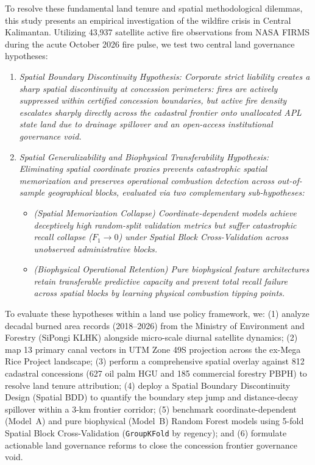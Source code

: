 To resolve these fundamental land tenure and spatial methodological dilemmas, this study presents an empirical investigation of the wildfire crisis in Central Kalimantan. Utilizing 43,937 satellite active fire observations from NASA FIRMS during the acute October 2026 fire pulse, we test two central land governance hypotheses:
\begin{enumerate}
    \item[$\mathbf{H_1}$:] \textit{Spatial Boundary Discontinuity Hypothesis: Corporate strict liability creates a sharp spatial discontinuity at concession perimeters: fires are actively suppressed within certified concession boundaries, but active fire density escalates sharply directly across the cadastral frontier onto unallocated APL state land due to drainage spillover and an open-access institutional governance void.}
    \item[$\mathbf{H_2}$:] \textit{Spatial Generalizability and Biophysical Transferability Hypothesis: Eliminating spatial coordinate proxies prevents catastrophic spatial memorization and preserves operational combustion detection across out-of-sample geographical blocks, evaluated via two complementary sub-hypotheses:}
    \begin{itemize}
        \item[$\mathbf{H_{2a}}$:] \textit{(Spatial Memorization Collapse) Coordinate-dependent models achieve deceptively high random-split validation metrics but suffer catastrophic recall collapse ($F_1 \to 0$) under Spatial Block Cross-Validation across unobserved administrative blocks.}
        \item[$\mathbf{H_{2b}}$:] \textit{(Biophysical Operational Retention) Pure biophysical feature architectures retain transferable predictive capacity and prevent total recall failure across spatial blocks by learning physical combustion tipping points.}
    \end{itemize}
\end{enumerate}

To evaluate these hypotheses within a land use policy framework, we: (1) analyze decadal burned area records (2018--2026) from the Ministry of Environment and Forestry (SiPongi KLHK) alongside micro-scale diurnal satellite dynamics; (2) map 13 primary canal vectors in UTM Zone 49S projection across the ex-Mega Rice Project landscape; (3) perform a comprehensive spatial overlay against 812 cadastral concessions (627 oil palm HGU and 185 commercial forestry PBPH) to resolve land tenure attribution; (4) deploy a Spatial Boundary Discontinuity Design (Spatial BDD) to quantify the boundary step jump and distance-decay spillover within a 3-km frontier corridor; (5) benchmark coordinate-dependent (Model~A) and pure biophysical (Model~B) Random Forest models using 5-fold Spatial Block Cross-Validation (\texttt{GroupKFold} by regency); and (6) formulate actionable land governance reforms to close the concession frontier governance void.
